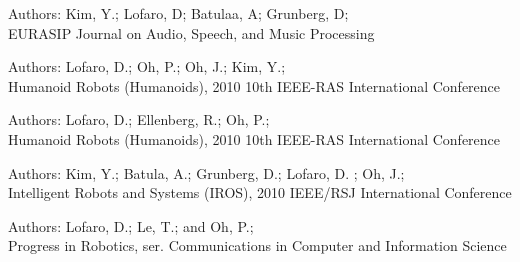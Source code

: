 \begin{resume}
\begin{position}
Authors: Kim, Y.; Lofaro, D; Batulaa, A; Grunberg, D;\\
EURASIP Journal on Audio, Speech, and Music Processing
\end{position}






\begin{position}
Authors: Lofaro, D.; Oh, P.; Oh, J.; Kim, Y.; \\
Humanoid Robots (Humanoids), 2010 10th IEEE-RAS International Conference 
\end{position}

\begin{position}
Authors: Lofaro, D.; Ellenberg, R.; Oh, P.;\\
Humanoid Robots (Humanoids), 2010 10th IEEE-RAS International Conference 
\end{position}















\begin{position}
Authors: Kim, Y.; Batula, A.; Grunberg, D.; Lofaro, D. ; Oh, J.;\\
Intelligent Robots and Systems (IROS), 2010 IEEE/RSJ International Conference
\end{position}



\begin{position}
Authors: Lofaro, D.; Le, T.; and Oh, P.; \\
Progress in Robotics, ser. Communications in Computer and Information Science
\end{position}


\end{resume}
